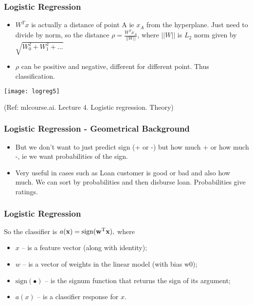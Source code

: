 \begin{frame}[fragile]\frametitle{Logistic Regression}
\begin{itemize}

\item $W^Tx$ is actually a distance of point A ie $x_A$ from the hyperplane. Just need to divide by norm, so the distance $\rho = \frac{W^Tx_A}{||W||}$, where $||W||$ is $L_2$ norm given by $\sqrt{W_0^2 + W_1^2 + \ldots}$
\item $\rho$ can be positive and negative, different for different point. Thus classification.
\end{itemize}

\begin{center}
\texttt{[image: logreg5]}
\end{center}

{\tiny (Ref: mlcourse.ai. Lecture 4. Logistic regression. Theory)}

\end{frame}


\begin{frame}[fragile]\frametitle{Logistic Regression - Geometrical Background}

\begin{itemize}
\item But we don't want to just predict sign (+ or -) but how much + or how much -, ie we want probabilities of the sign.
\item Very useful in cases such as Loan customer is good or bad and also how much. We can sort by probabilities and then disburse loan. Probabilities give ratings.
\end{itemize}

\end{frame}



\begin{frame}[fragile]\frametitle{Logistic Regression}

So the classifier is $a(\textbf{x}) = \text{sign}(\textbf{w}^\text{T}\textbf x),$ where
 \begin{itemize}
 \item $x$ – is a feature vector (along with identity);
\item $w$ – is a vector of weights in the linear model (with bias w0);
\item $\text{sign}(\bullet)$ – is the signum function that returns the sign of its argument;
\item $a(x)$ – is a classifier response for $x$.
  \end{itemize}
\end{frame}


